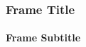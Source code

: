 \begin{frame}
\frametitle{Frame Title}
\framesubtitle{Frame Subtitle}
\label{slide:slidelabel}
\end{frame}
